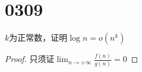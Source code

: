 \section{0309}

\begin{questions}

    \question $k$为正常数，证明$\log{n} = o(n^k)$
    \begin{solution}
        \begin{proof}
            只须证$\lim_{n \rightarrow + \infty} \frac{f(n)}{g(n)} = 0 $
        \end{proof}
    \end{solution}




\end{questions}
